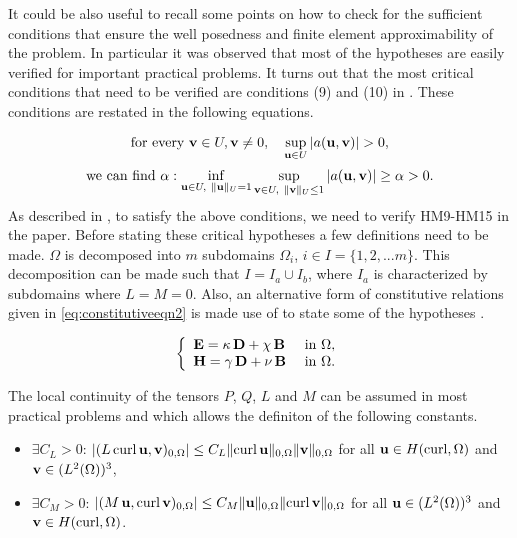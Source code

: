 It could be also useful to recall some points on
 how to check for the sufficient conditions that ensure 
the well posedness and finite element approximability of the problem.
In particular it was observed that most of the hypotheses are easily  
verified for important practical problems.
It turns out that the most critical conditions that need to be 
verified are conditions (9) and (10) in \cite{kalarickel2020well}.
These conditions are restated in the following equations. 

\begin{equation}\label{eq:condizione2diteorema2.22delmonk}
  \textrm{for} \ \textrm{every} \ {\bf v} \in U,
  {\bf v} \ne 0, \quad
  \sup_{{\bf u} \in U} \left| a({\bf u}, {\bf v}) \right| > 0,
\end{equation}
%
\begin{equation} \label{eq:infsup}
  \textrm{we} \ \textrm{can} \ \textrm{find} \ \alpha:
  \inf_{ {\bf u} \in U, \ \| {\bf u}\|_U = 1} 
  \sup_{{\bf v} \in U, \ \| {\bf v}\|_U \leq 1} 
    | a({\bf u}, {\bf v}) | \ge \alpha > 0.
\end{equation}
%
As described in \cite{kalarickel2020well}, to satisfy the above conditions,
we need to verify HM9-HM15 in the paper.
Before stating these critical hypotheses a few definitions need to be made.
$\Omega$ is decomposed into $m$ subdomains $\Omega_i$, $i \in I = \{1,2,...m\}$. 
This decomposition can be made such that $I=I_a \cup I_b$, 
where $I_a$ is characterized by subdomains where $L=M=0$. 
Also, an alternative form of constitutive relations given 
in \eqref{eq:constitutiveeqn2} is made use of 
to state some of the hypotheses \cite{noiregolarita}.

\begin{equation} \label{eq:constitutiveeqn2}
  \left\{
    \begin{array}{ll}
      {\bf E} = \kappa \, {\bf D} + \chi \, {\bf B}
        & \mbox{ in } \Omega,\\
      {\bf H} = \gamma \, {\bf D} + \nu \, {\bf B}
        & \mbox{ in } \Omega.\\
    \end{array}
  \right.
\end{equation}

The local continuity of the tensors $P$, $Q$, $L$ and $M$ can be assumed in most 
practical problems and which allows the definiton of the following constants.

\begin{itemize}[leftmargin=*,labelsep=5.8mm] 
  \item 
    $\exists C_L > 0$:
    $| ( L \, \mathrm{curl} \, {\bf u}, {\bf v} )_{0,\Omega} |
    \le 
    C_L \| \mathrm{curl} \, {\bf u} \|_{0,\Omega} \| {\bf v} \|_{0,\Omega}$ 
    for all ${\bf u} \in H(\mathrm{curl}, \Omega)$ and 
    ${\bf v} \in (L^2(\Omega))^3$,
  \item 
    $\exists C_M > 0$:
    $| ( M \, {\bf u}, \mathrm{curl} \, {\bf v} )_{0,\Omega} |
    \le 
    C_M \| {\bf u} \|_{0,\Omega} \| \mathrm{curl} \,{\bf v} \|_{0,\Omega}$ 
    for all ${\bf u} \in (L^2(\Omega))^3$ and 
    ${\bf v} \in H(\mathrm{curl}, \Omega)$.
\end{itemize}
%

